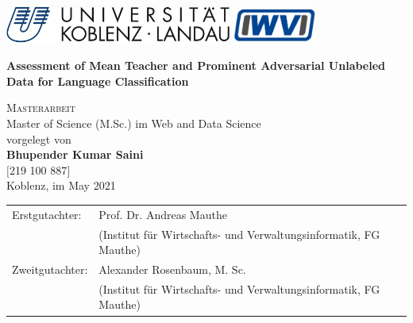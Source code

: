 
\begin{titlepage}
	\includegraphics[height=35pt]{img/uni-logo.png}
	\hfill
	\includegraphics[height=35pt]{img/iwvi.jpg}

	\begin{center}
	\vspace{2.5cm}	
	
	\huge\textbf{Assessment of Mean Teacher and Prominent Adversarial Unlabeled Data for Language Classification}
	


	\normalsize
	\vspace{1.5cm}	

	\textsc{\Large Masterarbeit}\\Master of Science (M.Sc.) im Web and Data Science\\[2cm] 
		
	vorgelegt von\\
	
	\textbf{\Large Bhupender Kumar Saini}\\ $ [ $219 100 887$ ] $\\ [1.5cm] 
	
	Koblenz, im May 2021 
	\end{center}
	\vfill
	\begin{tabular}{ll}
		Erstgutachter: & Prof. Dr. Andreas Mauthe\\ 
		 & \small{(Institut f\"ur Wirtschafts- und Verwaltungsinformatik, FG Mauthe)}\\
		Zweitgutachter: & Alexander Rosenbaum, M. Sc. \\ 
		& \small{(Institut f\"ur Wirtschafts- und Verwaltungsinformatik, FG Mauthe)}\\
	\end{tabular}
\end{titlepage}
